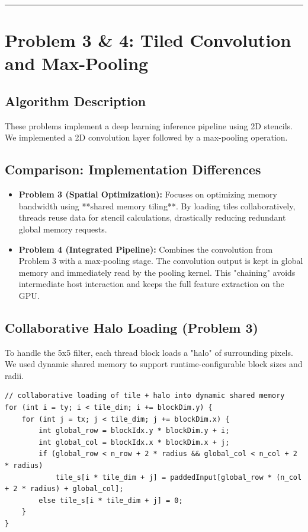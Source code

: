 \documentclass[11pt]{article}
\begin{document}
\noindent\rule{\textwidth}{0.4pt}

\section*{\color{white}Problem 3 \& 4: Tiled Convolution and Max-Pooling}

\subsection*{Algorithm Description}
These problems implement a deep learning inference pipeline using 2D stencils. We implemented a 2D convolution layer followed by a max-pooling operation.

\subsection*{Comparison: Implementation Differences}
\begin{itemize}
    \item \textbf{Problem 3 (Spatial Optimization):} Focuses on optimizing memory bandwidth using **shared memory tiling**. By loading tiles collaboratively, threads reuse data for stencil calculations, drastically reducing redundant global memory requests.
    \item \textbf{Problem 4 (Integrated Pipeline):} Combines the convolution from Problem 3 with a max-pooling stage. The convolution output is kept in global memory and immediately read by the pooling kernel. This "chaining" avoids intermediate host interaction and keeps the full feature extraction on the GPU.
\end{itemize}

\subsection*{Collaborative Halo Loading (Problem 3)}
To handle the 5x5 filter, each thread block loads a "halo" of surrounding pixels. We used dynamic shared memory to support runtime-configurable block sizes and radii.

\begin{lstlisting}
// collaborative loading of tile + halo into dynamic shared memory
for (int i = ty; i < tile_dim; i += blockDim.y) {
    for (int j = tx; j < tile_dim; j += blockDim.x) {
        int global_row = blockIdx.y * blockDim.y + i;
        int global_col = blockIdx.x * blockDim.x + j;
        if (global_row < n_row + 2 * radius && global_col < n_col + 2 * radius)
            tile_s[i * tile_dim + j] = paddedInput[global_row * (n_col + 2 * radius) + global_col];
        else tile_s[i * tile_dim + j] = 0;
    }
}
\end{lstlisting}
\end{document}
